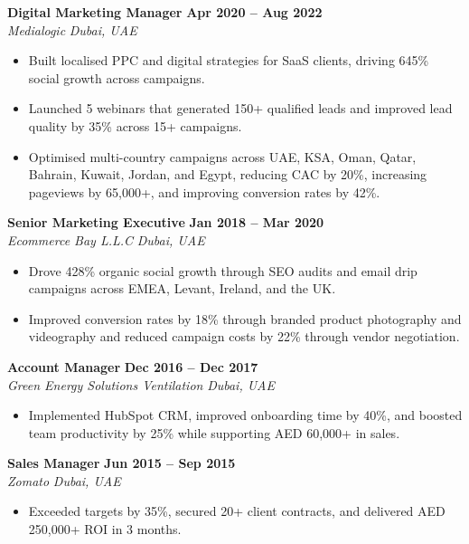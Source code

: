 \documentclass[10.5pt,a4paper]{article}
\begin{document}
\noindent\textbf{Digital Marketing Manager} \hfill \textbf{Apr 2020 -- Aug 2022}\\
\textit{Medialogic} \hfill \textit{Dubai, UAE}
\begin{itemize}[leftmargin=*,nosep,topsep=2pt]
  \item Built localised PPC and digital strategies for SaaS clients, driving 645\% social growth across campaigns.
  \item Launched 5 webinars that generated 150+ qualified leads and improved lead quality by 35\% across 15+ campaigns.
  \item Optimised multi-country campaigns across UAE, KSA, Oman, Qatar, Bahrain, Kuwait, Jordan, and Egypt, reducing CAC by 20\%, increasing pageviews by 65,000+, and improving conversion rates by 42\%.
\end{itemize}
\vspace{4pt}

\noindent\textbf{Senior Marketing Executive} \hfill \textbf{Jan 2018 -- Mar 2020}\\
\textit{Ecommerce Bay L.L.C} \hfill \textit{Dubai, UAE}
\begin{itemize}[leftmargin=*,nosep,topsep=2pt]
  \item Drove 428\% organic social growth through SEO audits and email drip campaigns across EMEA, Levant, Ireland, and the UK.
  \item Improved conversion rates by 18\% through branded product photography and videography and reduced campaign costs by 22\% through vendor negotiation.
\end{itemize}
\vspace{4pt}

\noindent\textbf{Account Manager} \hfill \textbf{Dec 2016 -- Dec 2017}\\
\textit{Green Energy Solutions Ventilation} \hfill \textit{Dubai, UAE}
\begin{itemize}[leftmargin=*,nosep,topsep=2pt]
  \item Implemented HubSpot CRM, improved onboarding time by 40\%, and boosted team productivity by 25\% while supporting AED 60,000+ in sales.
\end{itemize}
\vspace{4pt}

\noindent\textbf{Sales Manager} \hfill \textbf{Jun 2015 -- Sep 2015}\\
\textit{Zomato} \hfill \textit{Dubai, UAE}
\begin{itemize}[leftmargin=*,nosep,topsep=2pt]
  \item Exceeded targets by 35\%, secured 20+ client contracts, and delivered AED 250,000+ ROI in 3 months.
\end{itemize}
\vspace{4pt}
\end{document}
